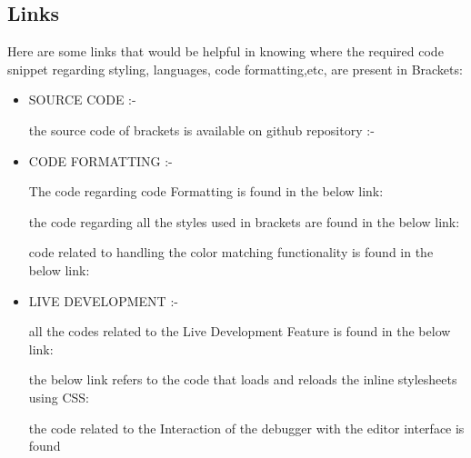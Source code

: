 \subsection{Links}
Here are some links that would be helpful in knowing where the required code snippet
regarding styling, languages, code formatting,etc, are present in Brackets: \newline
\begin{itemize}
\item SOURCE CODE :- 
\begin{center}
the source code of brackets is available on github repository :- 
\end{center}
\item CODE FORMATTING :- 
\begin{center}
The code regarding code Formatting is found in the below link: 
\end{center}
\begin{center}
the code regarding all the styles used in brackets are found in the below link: 
\end{center}
\begin{center}
code related to handling the color matching functionality is found in the below link:  
\end{center}
\item LIVE DEVELOPMENT :- 
\begin{center}
all the codes related to the Live Development Feature is found in the below link: 
\end{center}
\begin{center}
the below link refers to the code that loads and reloads the inline stylesheets using CSS: 
\end{center}
\begin{center}
the code related to the Interaction of the debugger with the editor interface is found

\end{center}
\end{itemize}
